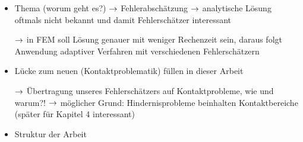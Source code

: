 \label{sec:Einleitung}

\begin{itemize}
\item Thema (worum geht es?) $\rightarrow$ Fehlerabschätzung $\rightarrow$ analytische Lösung oftmals nicht bekannt und damit Fehlerschätzer interessant
\item[$\rightarrow$] in FEM soll Lösung genauer mit weniger Rechenzeit sein, daraus folgt Anwendung adaptiver Verfahren mit verschiedenen Fehlerschätzern
\item Lücke zum neuen (Kontaktproblematik) füllen in dieser Arbeit
\item[$\rightarrow$] Übertragung unseres Fehlerschätzers auf Kontaktprobleme, wie und warum?! $\rightarrow$ möglicher Grund: Hindernisprobleme beinhalten Kontaktbereiche (später für Kapitel 4 interessant)
\item Struktur der Arbeit
\end{itemize}


\newpage

